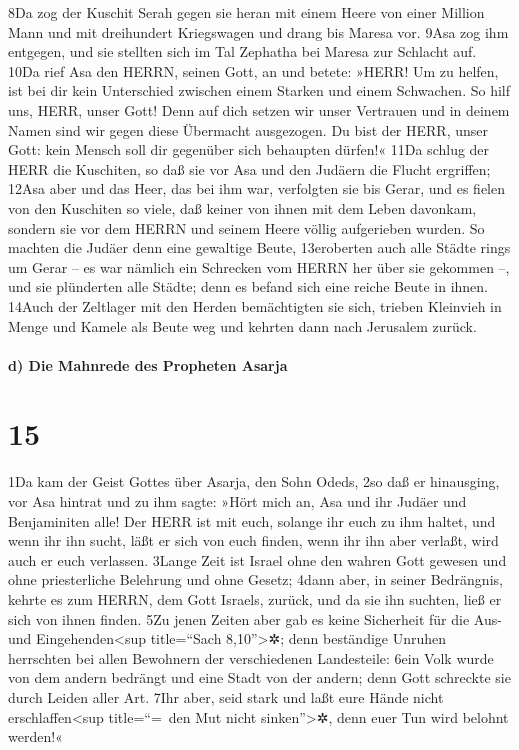 8Da zog der Kuschit Serah gegen sie heran mit einem Heere von einer
Million Mann und mit dreihundert Kriegswagen und drang bis Maresa vor.
9Asa zog ihm entgegen, und sie stellten sich im Tal Zephatha bei Maresa
zur Schlacht auf. 10Da rief Asa den HERRN, seinen Gott, an und betete:
»HERR! Um zu helfen, ist bei dir kein Unterschied zwischen einem Starken
und einem Schwachen. So hilf uns, HERR, unser Gott! Denn auf dich setzen
wir unser Vertrauen und in deinem Namen sind wir gegen diese Übermacht
ausgezogen. Du bist der HERR, unser Gott: kein Mensch soll dir gegenüber
sich behaupten dürfen!« 11Da schlug der HERR die Kuschiten, so daß sie
vor Asa und den Judäern die Flucht ergriffen; 12Asa aber und das Heer,
das bei ihm war, verfolgten sie bis Gerar, und es fielen von den
Kuschiten so viele, daß keiner von ihnen mit dem Leben davonkam, sondern
sie vor dem HERRN und seinem Heere völlig aufgerieben wurden. So machten
die Judäer denn eine gewaltige Beute, 13eroberten auch alle Städte rings
um Gerar -- es war nämlich ein Schrecken vom HERRN her über sie gekommen
--, und sie plünderten alle Städte; denn es befand sich eine reiche
Beute in ihnen. 14Auch der Zeltlager mit den Herden bemächtigten sie
sich, trieben Kleinvieh in Menge und Kamele als Beute weg und kehrten
dann nach Jerusalem zurück.

\hypertarget{d-die-mahnrede-des-propheten-asarja}{%
\paragraph{d) Die Mahnrede des Propheten
Asarja}\label{d-die-mahnrede-des-propheten-asarja}}

\hypertarget{section-14}{%
\section{15}\label{section-14}}

1Da kam der Geist Gottes über Asarja, den Sohn Odeds, 2so daß er
hinausging, vor Asa hintrat und zu ihm sagte: »Hört mich an, Asa und ihr
Judäer und Benjaminiten alle! Der HERR ist mit euch, solange ihr euch zu
ihm haltet, und wenn ihr ihn sucht, läßt er sich von euch finden, wenn
ihr ihn aber verlaßt, wird auch er euch verlassen. 3Lange Zeit ist
Israel ohne den wahren Gott gewesen und ohne priesterliche Belehrung und
ohne Gesetz; 4dann aber, in seiner Bedrängnis, kehrte es zum HERRN, dem
Gott Israels, zurück, und da sie ihn suchten, ließ er sich von ihnen
finden. 5Zu jenen Zeiten aber gab es keine Sicherheit für die Aus- und
Eingehenden\textless sup title=``Sach 8,10''\textgreater✲; denn
beständige Unruhen herrschten bei allen Bewohnern der verschiedenen
Landesteile: 6ein Volk wurde von dem andern bedrängt und eine Stadt von
der andern; denn Gott schreckte sie durch Leiden aller Art. 7Ihr aber,
seid stark und laßt eure Hände nicht erschlaffen\textless sup
title=``=~den Mut nicht sinken''\textgreater✲, denn euer Tun wird
belohnt werden!«

